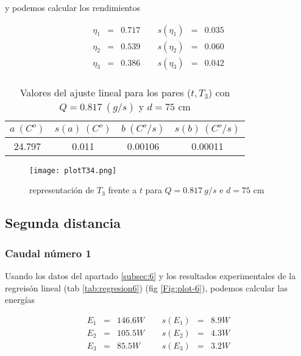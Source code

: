 \documentclass[12pt,a4paper]{article}
\begin{document}
 y podemos calcular los rendimientos 
 
\begin{equation} 
\begin{array}{lllllll}
\eta_1 & = & 0.717  &  \ \ &  s(\eta_1) & =  & 0.035   \\ 
 \eta_2 & = & 0.539  &  \ \ &  s(\eta_2) & =  & 0.060   \\ 
 \eta_3 & = & 0.386  &  \ \ &  s(\eta_3) & =  & 0.042   \\ 
 \end{array} 
\end{equation} 
 
 \begin{table}[h!] 	 \centering 
\begin{tabular}{|c|c|c|c|} 
\hline 
$a \ (C^o)$ & $s(a) \ (C^o)$ & $ b \ (C^o/s)$ & $s(b) \ (C^o/s)$  \\ \hline 
24.797  & 0.011 &  0.00106 & 0.00011 \\ 
\hline
\end{tabular} 
\caption{Valores del ajuste lineal para los pares ($t,T_3$) con $Q=0.817 \ (g/s)$ y $d= 75 $ cm} 
\label{tab:regresion5} 
\end{table} 
 
 
\begin{figure}[h!] 	 \centering 
\texttt{[image: plotT34.png]} 
\caption{representación de $T_3$ frente a $t$ para $Q = 0.817 \ g/s$ e $d = 75$ cm} 
\label{Fig:plot-5}  
\end{figure} 
 
\newpage 
 
 
 
 
\subsection{Segunda distancia}
\subsubsection{Caudal número 1} 
 
Usando los datos del apartado \ref{subsec:6} y los  resultados experimentales de la regreisón lineal (tab \ref{tab:regresion6}) (fig \ref{Fig:plot-6}), podemos calcular las energías 
 
 \begin{equation} 
\begin{array}{lllllll}
E_1 & = & 146.6 W &  \ \ &  s(E_1) & =  & 8.9  W \\ 
 E_2 & = & 105.5 W &  \ \ &  s(E_2) & =  & 4.3  W \\ 
 E_3 & = & 85.5 W &  \ \ &  s(E_3) & =  & 3.2  W \\ 
 \end{array} 
\end{equation} 
 
\end{document}
